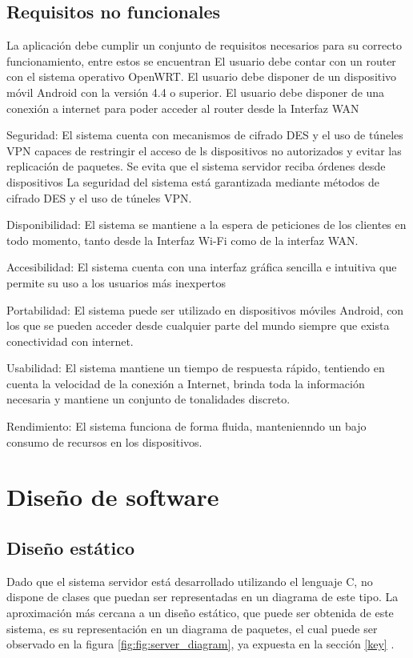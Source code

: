 \documentclass[12pt]{article}
\begin{document}
    \subsection{Requisitos no funcionales}
    La aplicación debe cumplir un conjunto de requisitos necesarios para su correcto funcionamiento, entre estos se encuentran 
    El usuario debe contar con un router con el sistema operativo OpenWRT.
    El usuario debe disponer de un dispositivo móvil Android con la versión 4.4 o superior.
    El usuario debe disponer de una conexión a internet para poder acceder al router desde la Interfaz WAN

    Seguridad:
    El sistema cuenta con mecanismos de cifrado DES y el uso de túneles VPN capaces de restringir el acceso de ls dispositivos no autorizados y evitar las replicación de paquetes.
    Se evita que el sistema servidor reciba órdenes desde dispositivos La seguridad del sistema está garantizada mediante métodos de cifrado DES y el uso de túneles VPN.
    
    Disponibilidad:
    El sistema se mantiene a la espera de peticiones de los clientes en todo momento, tanto desde la Interfaz Wi-Fi como de la interfaz WAN.

    Accesibilidad:
    El sistema cuenta con una interfaz gráfica sencilla e intuitiva que permite su uso a los usuarios más inexpertos

    Portabilidad:
    El sistema puede ser utilizado en dispositivos móviles Android, con los que se pueden acceder desde cualquier parte del mundo siempre que exista conectividad con internet.

    Usabilidad:
    El sistema mantiene un tiempo de respuesta rápido, tentiendo en cuenta la velocidad de la conexión a Internet, brinda toda la información necesaria y mantiene un conjunto de tonalidades discreto.

    Rendimiento:
    El sistema funciona de forma fluida, mantenienndo un bajo consumo de recursos en los dispositivos.

\section{Diseño de software}
    \subsection{Diseño estático}
        Dado que el sistema servidor está desarrollado utilizando el lenguaje C, no dispone de clases que puedan ser representadas en un diagrama de este tipo. La aproximación más cercana a un diseño estático, que puede ser obtenida de este sistema, es su representación en un diagrama de paquetes, el cual puede ser observado en la figura \ref{fig:fig:server_diagram}, ya expuesta en la sección \ref{key} .
\end{document}
